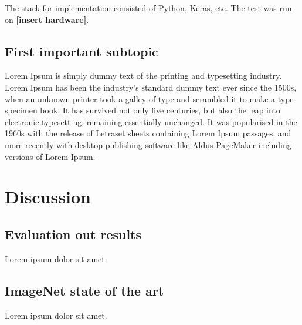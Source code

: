 \documentclass{kthreport}
\begin{document}
The stack for implementation consisted of Python, Keras, etc. The test was run on \textbf{[insert hardware]}.


\subsection{First important subtopic}

Lorem Ipsum is simply dummy text of the printing and typesetting industry. Lorem Ipsum has been the industry's standard dummy text ever since the 1500s, when an unknown printer took a galley of type and scrambled it to make a type specimen book. It has survived not only five centuries, but also the leap into electronic typesetting, remaining essentially unchanged. It was popularised in the 1960s with the release of Letraset sheets containing Lorem Ipsum passages, and more recently with desktop publishing software like Aldus PageMaker including versions of Lorem Ipsum.



\section{Discussion}

\subsection{Evaluation out results}

Lorem ipsum dolor sit amet.

\subsection{ImageNet state of the art}

Lorem ipsum dolor sit amet.



{}

\end{document}
